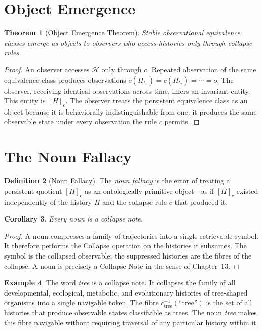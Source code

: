 \documentclass[12pt, a4paper, openany]{book}
\theoremstyle{plain}
\newtheorem{theorem}{Theorem}[chapter]
\newtheorem{corollary}[theorem]{Corollary}
\theoremstyle{definition}
\newtheorem{definition}[theorem]{Definition}
\newtheorem{example}[theorem]{Example}
\theoremstyle{remark}
\newcommand{\calH}{\mathcal{H}}
\begin{document}
\section{Object Emergence}

\begin{theorem}[Object Emergence Theorem]
Stable observational equivalence classes emerge as objects to observers
who access histories only through collapse rules.
\end{theorem}

\begin{proof}
An observer accesses $\calH$ only through $c$. Repeated observation of the same
equivalence class produces observations $c(H_{t_1}) = c(H_{t_2}) = \cdots = o$.
The observer, receiving identical observations across time, infers an invariant
entity. This entity is $[H]_c$. The observer treats the persistent equivalence
class as an object because it is behaviorally indistinguishable from one: it
produces the same observable state under every observation the rule $c$ permits.
\end{proof}

\section{The Noun Fallacy}

\begin{definition}[Noun Fallacy]
The \emph{noun fallacy} is the error of treating a persistent quotient $[H]_c$
as an ontologically primitive object---as if $[H]_c$ existed independently of
the history $H$ and the collapse rule $c$ that produced it.
\end{definition}

\begin{corollary}
Every noun is a collapse note.
\end{corollary}

\begin{proof}
A noun compresses a family of trajectories into a single retrievable symbol.
It therefore performs the Collapse operation on the histories it subsumes. The
symbol is the collapsed observable; the suppressed histories are the fibres of the
collapse. A noun is precisely a Collapse Note in the sense of Chapter~13.
\end{proof}

\begin{example}
The word \emph{tree} is a collapse note. It collapses the family of all
developmental, ecological, metabolic, and evolutionary histories of tree-shaped
organisms into a single navigable token. The fibre $c_{\mathrm{tree}}^{-1}(\text{``tree''})$
is the set of all histories that produce observable states classifiable as trees.
The noun \emph{tree} makes this fibre navigable without requiring traversal of any
particular history within it.
\end{example}
\end{document}
